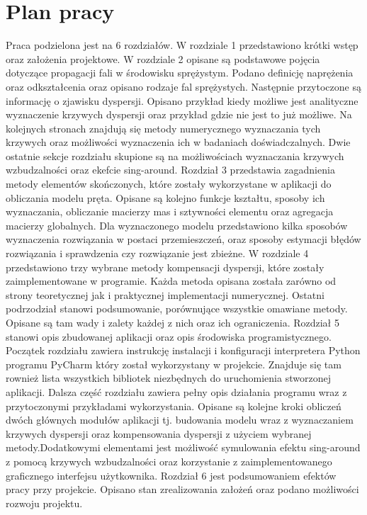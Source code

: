 \section{Plan pracy}
\label{sec:plan_pracy}

Praca podzielona jest na 6 rozdziałów. W rozdziale 1 przedstawiono krótki wstęp oraz założenia projektowe. W rozdziale 2 opisane są podstawowe pojęcia dotyczące propagacji fali w środowisku sprężystym. Podano definicję naprężenia oraz odkształcenia oraz opisano rodzaje fal sprężystych. Następnie przytoczone są informację o zjawisku dyspersji. Opisano przykład kiedy możliwe jest analityczne wyznaczenie krzywych dyspersji oraz przykład gdzie nie jest to już możliwe. Na kolejnych stronach znajdują się metody numerycznego wyznaczania tych krzywych oraz możliwości wyznaczenia ich w badaniach doświadczalnych. Dwie ostatnie sekcje rozdziału skupione są na możliwościach wyznaczania krzywych wzbudzalności oraz ekefcie sing-around. Rozdział 3 przedstawia zagadnienia metody elementów skończonych, które zostały wykorzystane w aplikacji do obliczania modelu pręta. Opisane są kolejno funkcje kształtu, sposoby ich wyznaczania, obliczanie macierzy mas i sztywności elementu oraz agregacja macierzy globalnych. Dla wyznaczonego modelu przedstawiono kilka sposobów wyznaczenia rozwiązania w postaci przemieszczeń, oraz sposoby estymacji błędów rozwiązania i sprawdzenia czy rozwiązanie jest zbieżne. W rozdziale 4 przedstawiono trzy wybrane metody kompensacji dyspersji, które zostały zaimplementowane w programie. Każda metoda opisana została zarówno od strony teoretycznej jak i praktycznej implementacji numerycznej. Ostatni podrzodział stanowi podsumowanie, porównujące wszystkie omawiane metody. Opisane są tam wady i zalety każdej z nich oraz ich ograniczenia. Rozdział 5 stanowi opis zbudowanej aplikacji oraz opis środowiska programistycznego. Początek rozdziału zawiera instrukcję instalacji i konfiguracji interpretera Python programu PyCharm  który został wykorzystany w projekcie. Znajduje się tam rownież lista wszystkich bibliotek niezbędnych do uruchomienia stworzonej aplikacji. Dalsza część rozdziału zawiera pełny opis działania programu wraz z przytoczonymi przykładami wykorzystania. Opisane są kolejne kroki obliczeń dwóch głównych modułów aplikacji tj. budowania modelu wraz z wyznaczaniem krzywych dyspersji oraz kompensowania dyspersji z użyciem wybranej metody.Dodatkowymi elementami jest możliwość symulowania efektu sing-around z pomocą krzywych wzbudzalności oraz korzystanie z zaimplementowanego graficznego interfejsu użytkownika. Rozdział 6 jest podsumowaniem efektów pracy przy projekcie. Opisano stan zrealizowania założeń oraz podano możliwości rozwoju projektu.




















